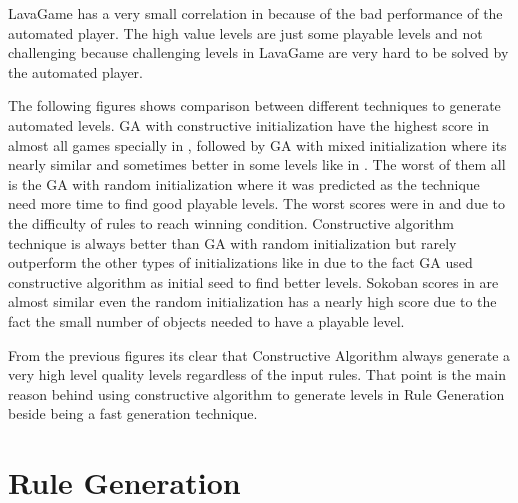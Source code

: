 LavaGame has a very small correlation in  because of the bad performance of the automated player. The high value levels are just some playable levels and not challenging because challenging levels in LavaGame are very hard to be solved by the automated player.


The following figures shows comparison between different techniques to generate automated levels. GA with constructive initialization have the highest score in almost all games specially in , followed by GA with mixed initialization where its nearly similar and sometimes better in some levels like in . The worst of them all is the GA with random initialization where it was predicted as the technique need more time to find good playable levels. The worst scores were in  and  due to the difficulty of rules to reach winning condition. Constructive algorithm technique is always better than GA with random initialization but rarely outperform the other types of initializations like in  due to the fact GA used constructive algorithm as initial seed to find better levels. Sokoban scores in  are almost similar even the random initialization has a nearly high score due to the fact the small number of objects needed to have a playable level.






From the previous figures its clear that Constructive Algorithm always generate a very high level quality levels regardless of the input rules. That point is the main reason behind using constructive algorithm to generate levels in Rule Generation beside being a fast generation technique.

\section{Rule Generation}
